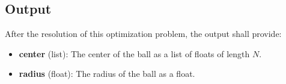 \documentclass{article}
\begin{document}
\subsection*{Output}
After the resolution of this optimization problem, the output shall provide:
\begin{itemize}
    \item \textbf{center} (list): The center of the ball as a list of floats of length \( N \).
    \item \textbf{radius} (float): The radius of the ball as a float.
\end{itemize}
\end{document}
